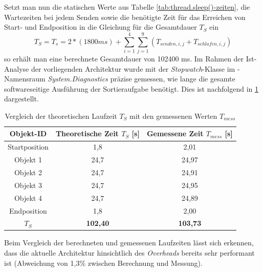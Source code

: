 Setzt man nun die statischen Werte aus Tabelle \ref{tab:thread.sleep()-zeiten}, die Wartezeiten bei jedem Senden sowie die benötigte Zeit für das Erreichen von Start- und Endposition in die Gleichung für die Gesamtdauer $T_{S}$ ein
\begin{equation}
	T_{S} = 	T_{s} = 2*(1800ms) + \sum_{i=1}^{4} \sum_{j=1}^{9} (T_{senden, i, j} + T_{schlafen, i, j})
\end{equation}
so erhält man eine berechnete Gesamtdauer von 102400 ms. Im Rahmen der Ist-Analyse der vorliegenden Architektur wurde mit der \textit{Stopwatch}-Klasse im \csharp-Namensraum \textit{System.Diagnostics} präzise gemessen, wie lange die gesamte softwareseitige Ausführung der Sortieraufgabe benötigt. Dies ist nachfolgend in \ref{tab:laufzeitanalyse_ist} dargestellt.
\begin{table}[h!]
	\renewcommand{\arraystretch}{1.2} %
	\begin{tabular}{|c|c|c|}
		\hline
		\textbf{Objekt-ID} & \textbf{Theoretische Zeit $T_S$ [s]} & \textbf{Gemessene Zeit $T_{mess}$ [s]} \\ \hline
		Startposition & 1,8 & 2,01 \\ \hline
		Objekt 1 & 24,7 & 24,97 \\ \hline
		Objekt 2 & 24,7 & 24,91 \\ \hline
		Objekt 3 & 24,7 & 24,95 \\ \hline
		Objekt 4 & 24,7 & 24,89 \\ \hline
		Endposition & 1,8 & 2,00 \\ \hline
		\textbf{$T_{S}$} & \textbf{102,40} & \textbf{103,73} \\ \hline
	\end{tabular}
	\caption{Vergleich der theoretischen Laufzeit $T_S$ mit den gemessenen Werten $T_{mess}$}
	\label{tab:laufzeitanalyse_ist}
\end{table}
\newline Beim Vergleich der berechneten und gemessenen Laufzeiten lässt sich erkennen, dass die aktuelle Architektur hinsichtlich des \textit{Overheads} bereits sehr performant ist (Abweichung von 1,3\% zwischen Berechnung und Messung).
